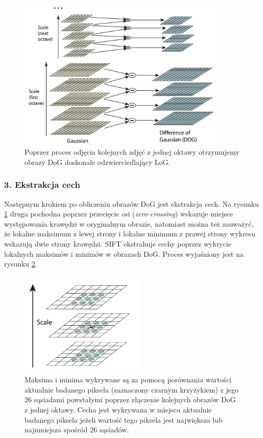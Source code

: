 \begin{figure}[htb]
  \centering
  \includegraphics[width=10cm]{gfx/dog}
  \caption{\cite{Lowe:2004:DIF:993451.996342} Poprzez proces odjęcia kolejnych zdjęć z jednej oktawy otrzymujemy obrazy DoG doskonale odzwierciedlający LoG.}
  \label{fig:proponowane_algorytmy:dog}
\end{figure}

\subsubsection{3. Ekstrakcja cech}
\label{sec:proponowane_algorytmy:ekstrakcja_cech}

Następnym krokiem po obliczeniu obrazów DoG jest ekstrakcja cech. Na rysunku \ref{fig:proponowane_algorytmy:dog} druga pochodna poprzez przecięcie osi (\textit{zero-crossing}) wskazuje miejsce występowania krawędzi w oryginalnym obrazie, natomiast można też zauważyć, że lokalne maksimum z lewej strony i lokalne minimum z prawej strony wykresu wskazują dwie strony krawędzi. SIFT ekstrahuje cechy poprzez wykrycie lokalnych maksimów i minimów w obrazach DoG. Proces wyjaśniony jest na rysunku \ref{fig:proponowane_algorytmy:max}.

\begin{figure}[H]
  \centering
  \includegraphics[width=6cm]{gfx/max}
  \caption{\cite{Lowe:2004:DIF:993451.996342} Maksima i minima wykrywane są za pomocą porównania wartości aktualnie badanego piksela (zaznaczony czarnym krzyżykiem) z jego 26 sąsiadami powstałymi poprzez złączenie kolejnych obrazów DoG z jednej oktawy. Cecha jest wykrywana w miejscu aktualnie badanego piksela jeżeli wartość tego piksela jest największa lub najmniejsza spośród 26 sąsiadów.}
  \label{fig:proponowane_algorytmy:max}
\end{figure}

